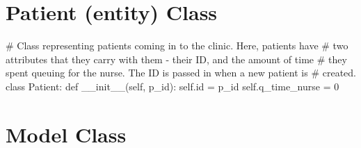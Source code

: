 \documentclass[
  letterpaper,
  DIV=11,
  numbers=noendperiod]{scrreprt}
\newenvironment{Shaded}{\begin{snugshade}}{\end{snugshade}}
\newcommand{\BuiltInTok}[1]{\textcolor[rgb]{0.00,0.23,0.31}{#1}}
\newcommand{\CommentTok}[1]{\textcolor[rgb]{0.37,0.37,0.37}{#1}}
\newcommand{\DecValTok}[1]{\textcolor[rgb]{0.68,0.00,0.00}{#1}}
\newcommand{\FunctionTok}[1]{\textcolor[rgb]{0.28,0.35,0.67}{#1}}
\newcommand{\KeywordTok}[1]{\textcolor[rgb]{0.00,0.23,0.31}{#1}}
\newcommand{\NormalTok}[1]{\textcolor[rgb]{0.00,0.23,0.31}{#1}}
\newcommand{\OperatorTok}[1]{\textcolor[rgb]{0.37,0.37,0.37}{#1}}
\newcommand{\VariableTok}[1]{\textcolor[rgb]{0.07,0.07,0.07}{#1}}
\begin{document}
\section{Patient (entity) Class}\label{patient-entity-class}

\begin{Shaded}
\begin{Highlighting}[]
\CommentTok{\# Class representing patients coming in to the clinic.  Here, patients have}
\CommentTok{\# two attributes that they carry with them {-} their ID, and the amount of time}
\CommentTok{\# they spent queuing for the nurse.  The ID is passed in when a new patient is}
\CommentTok{\# created.}
\KeywordTok{class}\NormalTok{ Patient:}
    \KeywordTok{def} \FunctionTok{\_\_init\_\_}\NormalTok{(}\VariableTok{self}\NormalTok{, p\_id):}
        \VariableTok{self}\NormalTok{.}\BuiltInTok{id} \OperatorTok{=}\NormalTok{ p\_id}
        \VariableTok{self}\NormalTok{.q\_time\_nurse }\OperatorTok{=} \DecValTok{0}
\end{Highlighting}
\end{Shaded}

\section{Model Class}\label{model-class-1}
\end{document}
